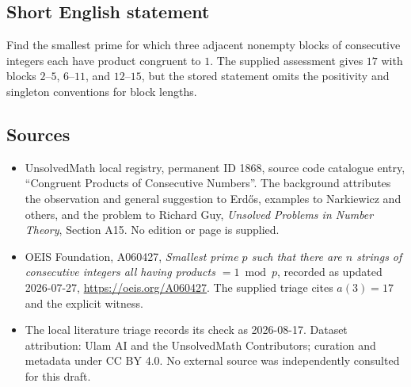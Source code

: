 \documentclass[11pt]{article}
\begin{document}
\subsection{Short English statement}
Find the smallest prime for which three adjacent nonempty blocks of consecutive integers each have product congruent to $1$. The supplied assessment gives $17$ with blocks $2$--$5$, $6$--$11$, and $12$--$15$, but the stored statement omits the positivity and singleton conventions for block lengths.
\subsection{Sources}
\begin{itemize}
\item UnsolvedMath local registry, permanent ID 1868, source code catalogue entry, ``Congruent Products of Consecutive Numbers''. The background attributes the observation and general suggestion to Erdős, examples to Narkiewicz and others, and the problem to Richard Guy, \emph{Unsolved Problems in Number Theory}, Section A15. No edition or page is supplied.
\item OEIS Foundation, A060427, \emph{Smallest prime $p$ such that there are $n$ strings of consecutive integers all having products $=1\bmod p$}, recorded as updated 2026-07-27, \url{https://oeis.org/A060427}. The supplied triage cites $a(3)=17$ and the explicit witness.
\item The local literature triage records its check as 2026-08-17. Dataset attribution: Ulam AI and the UnsolvedMath Contributors; curation and metadata under CC BY 4.0. No external source was independently consulted for this draft.
\end{itemize}
\end{document}
